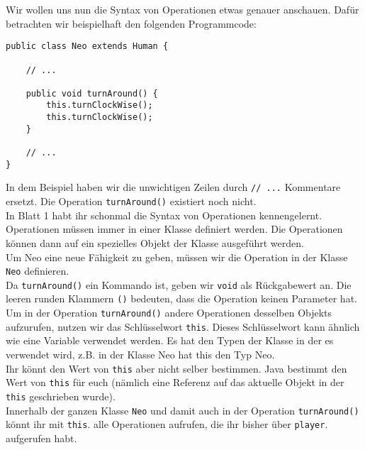 \begin{Infobox}
    Wir wollen uns nun die Syntax von Operationen etwas genauer anschauen. 
    Dafür betrachten wir beispielhaft den folgenden Programmcode:

    \begin{lstlisting}[numbers=none]
public class Neo extends Human {

    // ...

    public void turnAround() {
        this.turnClockWise();
        this.turnClockWise();
    }

    // ...
}
    \end{lstlisting}

    In dem Beispiel haben wir die unwichtigen Zeilen durch \lstinline{// ...} Kommentare ersetzt.
    Die Operation \lstinline{turnAround()} existiert noch nicht.\\

    In Blatt 1 habt ihr schonmal die Syntax von Operationen kennengelernt.
    Operationen müssen immer in einer Klasse definiert werden.
    Die Operationen können dann auf ein spezielles Objekt der Klasse ausgeführt werden.\\

    Um Neo eine neue Fähigkeit zu geben, müssen wir die Operation in der Klasse \lstinline{Neo} definieren.\\

    Da \lstinline{turnAround()} ein Kommando ist, geben wir \lstinline{void} als Rückgabewert an.
    Die leeren runden Klammern \lstinline{()} bedeuten, dass die Operation keinen Parameter hat.\\

    Um in der Operation \lstinline{turnAround()} andere Operationen desselben Objekts aufzurufen, nutzen wir das Schlüsselwort \lstinline{this}.
    Dieses Schlüsselwort kann ähnlich wie eine Variable verwendet werden. Es hat den Typen der Klasse in der es verwendet wird, z.B. in der Klasse Neo hat this den Typ Neo.\\

    Ihr könnt den Wert von \lstinline{this} aber nicht selber bestimmen.
    Java bestimmt den Wert von \lstinline{this} für euch (nämlich eine Referenz auf das aktuelle Objekt in der \lstinline{this} geschrieben wurde).\\

    Innerhalb der ganzen Klasse \lstinline{Neo} und damit auch in der Operation \lstinline{turnAround()} könnt ihr mit \lstinline{this}. alle Operationen aufrufen, die ihr bisher über \lstinline{player}. aufgerufen habt.

\end{Infobox}


